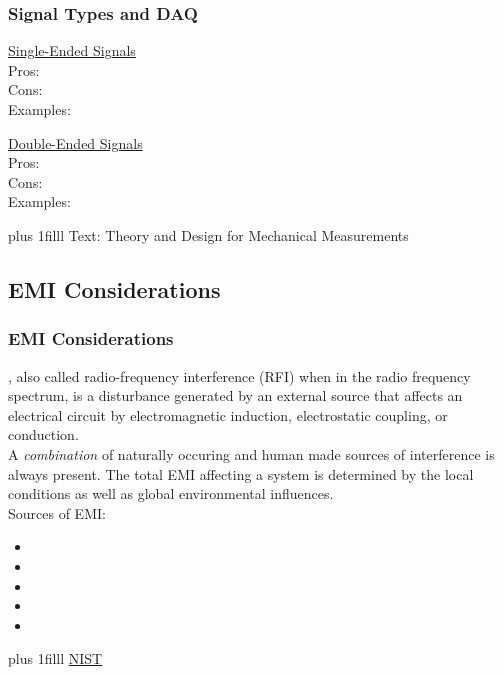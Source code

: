 \documentclass[fleqn]{beamer} %
\newcommand{\sectionIIsubsectionItitle}{Signal Types and DAQ}
\newcommand{\sectionIIsubsectionIItitle}{EMI Considerations}
\newcommand{\btVFill}{\vskip0pt plus 1filll}
\begin{document}
			 \begin{frame}[label=sectionIIsubsectionI]
				\frametitle{\sectionIIsubsectionItitle} \scriptsize

				\begin{multicols}{2}
					\underline{Single-Ended Signals} \vspace{10mm}\\
					
					Pros:\vspace{10mm}\\
					Cons:\vspace{10mm}\\
					Examples:
					
					\underline{Double-Ended Signals} \vspace{10mm}\\
					
					Pros:\vspace{10mm}\\
					Cons:\vspace{10mm}\\
					Examples:
					
					
				\end{multicols}
				\btVFill
				\tiny{Text: Theory and Design for Mechanical Measurements}
			\end{frame}


		\subsection{\sectionIIsubsectionIItitle}\label{sectionIIsubsectionII}

			\begin{frame}
				\frametitle{\sectionIIsubsectionIItitle} \scriptsize
				\bigskip

				\underline{\hspace{20mm}}, also called radio-frequency interference (RFI) when in the radio frequency spectrum, is a disturbance generated by an external source that affects an electrical circuit by electromagnetic induction, electrostatic coupling, or conduction. \vspace{5mm}\\


				A {\it combination} of naturally occuring and human made sources of interference is always present. The total EMI affecting a system is determined by the local conditions as well as global environmental influences. \vspace{5mm}\\


				Sources of EMI:
				\begin{itemize}

					\item 
					\item  
					\item 
					\item 
					\item 

				\end{itemize}


				\btVFill
				\tiny{\href{https://csrc.nist.gov/glossary/term/electromagnetic_interference}{NIST}}		
			\end{frame}
\end{document}
